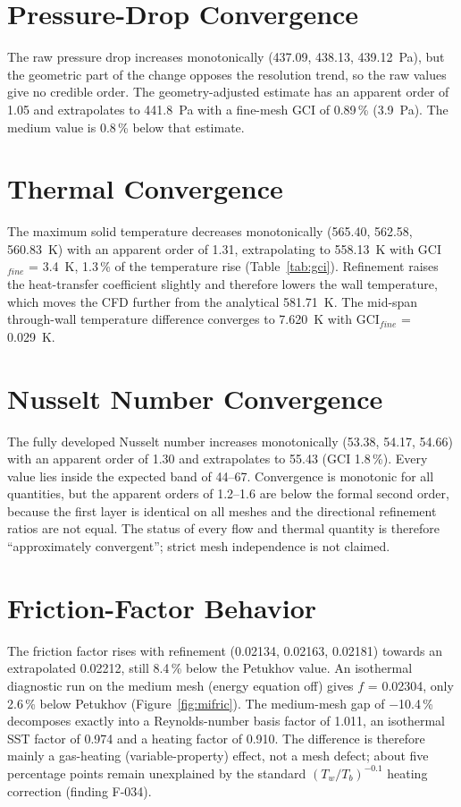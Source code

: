 \section{Pressure-Drop Convergence}
The raw pressure drop increases monotonically (437.09, 438.13, 439.12~Pa), but the geometric part of the change opposes the resolution trend,
so the raw values give no credible order. The geometry-adjusted estimate has an apparent order of 1.05 and extrapolates to 441.8~Pa with a
fine-mesh GCI of 0.89\,\% (3.9~Pa). The medium value is 0.8\,\% below that estimate.

\section{Thermal Convergence}
The maximum solid temperature decreases monotonically (565.40, 562.58, 560.83~K) with an apparent order of 1.31, extrapolating to 558.13~K
with GCI$_{fine}$ = 3.4~K, 1.3\,\% of the temperature rise (Table~\ref{tab:gci}). Refinement raises the heat-transfer coefficient slightly
and therefore lowers the wall temperature, which moves the CFD further from the analytical 581.71~K. The mid-span through-wall temperature
difference converges to 7.620~K with GCI$_{fine}$ = 0.029~K.



\section{Nusselt Number Convergence}
The fully developed Nusselt number increases monotonically (53.38, 54.17, 54.66) with an apparent order of 1.30 and extrapolates to 55.43
(GCI 1.8\,\%). Every value lies inside the expected band of 44--67. Convergence is monotonic for all quantities, but the apparent orders of
1.2--1.6 are below the formal second order, because the first layer is identical on all meshes and the directional refinement ratios are not
equal. The status of every flow and thermal quantity is therefore ``approximately convergent''; strict mesh independence is not claimed.

\section{Friction-Factor Behavior}
The friction factor rises with refinement (0.02134, 0.02163, 0.02181) towards an extrapolated 0.02212, still 8.4\,\% below the Petukhov
value. An isothermal diagnostic run on the medium mesh (energy equation off) gives $f$ = 0.02304, only 2.6\,\% below Petukhov
(Figure~\ref{fig:mifric}). The medium-mesh gap of $-$10.4\,\% decomposes exactly into a Reynolds-number basis factor of 1.011, an isothermal SST
factor of 0.974 and a heating factor of 0.910. The difference is therefore mainly a gas-heating (variable-property) effect, not a mesh defect;
about five percentage points remain unexplained by the standard $(T_w/T_b)^{-0.1}$ heating correction (finding F-034).

